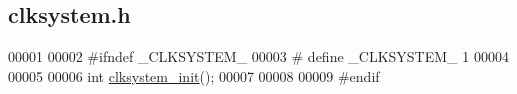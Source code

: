 \hypertarget{clksystem_8h_source}{
\subsection{clksystem.h}
}

\begin{DoxyCode}
00001 
00002 \textcolor{preprocessor}{#ifndef \_CLKSYSTEM\_}
00003 \textcolor{preprocessor}{}\textcolor{preprocessor}{#   define \_CLKSYSTEM\_ 1}
00004 \textcolor{preprocessor}{}
00005 
00006 \textcolor{keywordtype}{int} \hyperlink{clksystem_8cpp_a098d30ebaad7a94505407605314930e5}{clksystem_init}();
00007 
00008 
00009 \textcolor{preprocessor}{#endif}
\end{DoxyCode}
